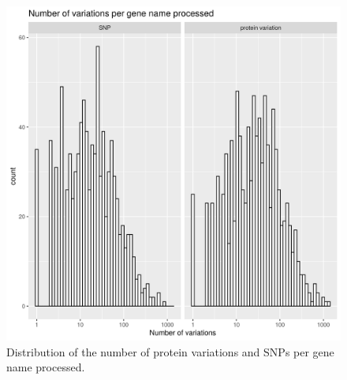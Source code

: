 \begin{figure}[!htbp]
  \includegraphics[width=\textwidth]{ncbi_peregrine_results/fig_snps_per_gene_name_processed.png}
  \caption{
    Distribution of the number of protein variations and SNPs per gene name processed.
  }
  \label{fig:snps_per_gene_name_processed}
\end{figure}

%

